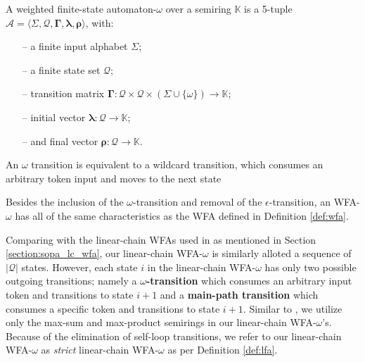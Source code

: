 \begin{definition}
  \label{def:wfa_w}
  A weighted finite-state automaton-$\omega$ over a semiring $\mathbb{K}$ is a
  5-tuple $\mathcal{A} = \langle \Sigma, \mathcal{Q}, \bm{\Gamma}, \bm{\lambda}, \bm{\rho}
  \rangle$, with:

  \begin{itemize}
  \itemsep0em
    \item[--] a finite input alphabet $\Sigma$;
    \item[--] a finite state set $\mathcal{Q}$;
    \item[--] transition matrix $\bm{\Gamma}: \mathcal{Q} \times \mathcal{Q} \times (\Sigma \cup \{\omega\}) \rightarrow \mathbb{K}$;
    \item[--] initial vector $\bm{\lambda}: \mathcal{Q} \rightarrow \mathbb{K}$;
    \item[--] and final vector $\bm{\rho}: \mathcal{Q} \rightarrow \mathbb{K}$.
  \end{itemize}

  \begin{remark}
    An $\omega$ transition is equivalent to a wildcard transition, which
    consumes an arbitrary token input and moves to the next state
  \end{remark}

  \begin{remark}
    Besides the inclusion of the $\omega$-transition and removal of the
    $\epsilon$-transition, an WFA-$\omega$ has all of the same characteristics
    as the WFA defined in Definition \ref{def:wfa}.
  \end{remark}
\end{definition}

Comparing with the linear-chain WFAs used in \citet{schwartz2018sopa} as
mentioned in Section \ref{section:sopa_lc_wfa}, our linear-chain WFA-$\omega$ is
similarly alloted a sequence of $|\mathcal{Q}|$ states. However, each state $i$
in the linear-chain WFA-$\omega$ has only two possible outgoing transitions;
namely a \textbf{$\omega$-transition} which consumes an arbitrary input token
and transitions to state $i+1$ and a \textbf{main-path transition} which
consumes a specific token and transitions to state $i+1$. Similar to
\citet{schwartz2018sopa}, we utilize only the max-sum and max-product semirings
in our linear-chain WFA-$\omega$'s. Because of the elimination of self-loop
transitions, we refer to our linear-chain WFA-$\omega$ as \textit{strict}
linear-chain WFA-$\omega$ as per Definition \ref{def:lfa}. 

